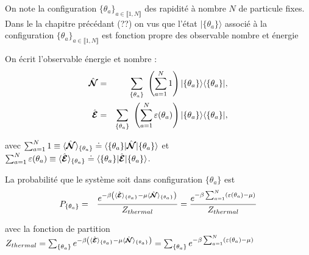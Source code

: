 On note la configuration $\{ \theta_a \}_{a\in \llbracket 1 , N \rrbracket}$ des rapidité à nombre $N$ de particule fixes. Dans le la chapitre précédant (??) on vus que l'état $\vert \{ \theta_a \} \rangle$ associé à la configuration $\{ \theta_a \}_{a\in \llbracket 1 , N \rrbracket}$ est fonction propre des observable nombre et énergie 

On écrit l'observable énergie et nombre :
	\begin{eqnarray}
		\operator{\mathcal{N}} & = & \sum_{ \{\theta_a\} }   \left ( \sum_{a = 1}^N  1 \right )  \vert \{ \theta_a\}\rangle	\langle \{ \theta_a \}\vert,\\
		\operator{\mathcal{E}} & = & \sum_{\{ \theta_a\}}  \left ( \sum_{a = 1}^N  \varepsilon ( \theta_a ) \right )   \vert \{ \theta_a\}\rangle	\langle \{ \theta_a \}\vert,		
	\end{eqnarray}
	
	avec $\sum_{a = 1}^N 1 \equiv \langle \hat{\bm{\mathcal{N}}} \rangle_{ \{\theta_a \} }  \doteq  \langle \{ \theta_a \}\vert  \hat{\bm{\mathcal{N}}} \vert\{ \theta_a\}\rangle  $ et $  \sum_{a = 1}^N  \varepsilon ( \theta_a ) \equiv \langle \hat{\bm{\mathcal{E}}} \rangle_{\{\theta_a \}}  \doteq  \langle \{ \theta_a \}\vert  \hat{\bm{ \mathcal{E}}}  \vert\{ \theta_a\}\rangle $.

	
	La probabilité que le système soit dans configuration $\{ \theta_a \}$  est 
	\begin{eqnarray}
		P_{\{\theta_a \}} & = & \frac{e^{- \beta \left ( \langle \hat{\bm{\mathcal{E}}} \rangle_{\{\theta_a \}}   - \mu \langle \hat{\bm{\mathcal{N}}} \rangle_{\{\theta_a \}} \right )}}{Z_{thermal}} = \frac{e^{- \beta \sum_{a=1}^N  ( \varepsilon( \theta_a )   - \mu  )}}{Z_{thermal}}	
	\end{eqnarray}
	
	avec la fonction de partition $Z_{thermal} = \sum_{\{ \theta_a\}}e^{- \beta \left ( \langle \hat{\bm{\mathcal{E}}} \rangle_{\{\theta_a \}}   - \mu \langle \hat{\bm{\mathcal{N}}} \rangle_{\{\theta_a \}} \right )} = \sum_{\{ \theta_a\}} e^{- \beta \sum_{a=1}^N  ( \varepsilon( \theta_a )   - \mu  )}$
	

